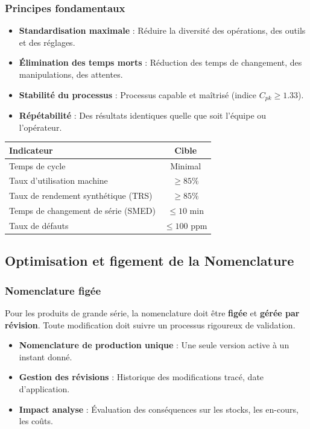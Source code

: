 \documentclass{article}
\begin{document}
\subsubsection{Principes fondamentaux}

\begin{itemize}
    \item \textbf{Standardisation maximale} : Réduire la diversité des opérations, des outils et des réglages.
    \item \textbf{Élimination des temps morts} : Réduction des temps de changement, des manipulations, des attentes.
    \item \textbf{Stabilité du processus} : Processus capable et maîtrisé (indice $C_{pk} \geq 1.33$).
    \item \textbf{Répétabilité} : Des résultats identiques quelle que soit l'équipe ou l'opérateur.
\end{itemize}

\begin{tcolorbox}[colback=green!5!white, colframe=green!50!black, title=Indicateurs clés pour la Classe A]
\begin{tabular}{|l|c|}
\hline
\textbf{Indicateur} & \textbf{Cible} \\
\hline
Temps de cycle & Minimal \\
Taux d'utilisation machine & $\geq 85\%$ \\
Taux de rendement synthétique (TRS) & $\geq 85\%$ \\
Temps de changement de série (SMED) & $\leq 10$ min \\
Taux de défauts & $\leq 100$ ppm \\
\hline
\end{tabular}
\end{tcolorbox}

\subsection{Optimisation et figement de la Nomenclature}

\subsubsection{Nomenclature figée}

Pour les produits de grande série, la nomenclature doit être \textbf{figée} et \textbf{gérée par révision}. Toute modification doit suivre un processus rigoureux de validation.

\begin{itemize}
    \item \textbf{Nomenclature de production unique} : Une seule version active à un instant donné.
    \item \textbf{Gestion des révisions} : Historique des modifications tracé, date d'application.
    \item \textbf{Impact analyse} : Évaluation des conséquences sur les stocks, les en-cours, les coûts.
\end{itemize}
\end{document}
